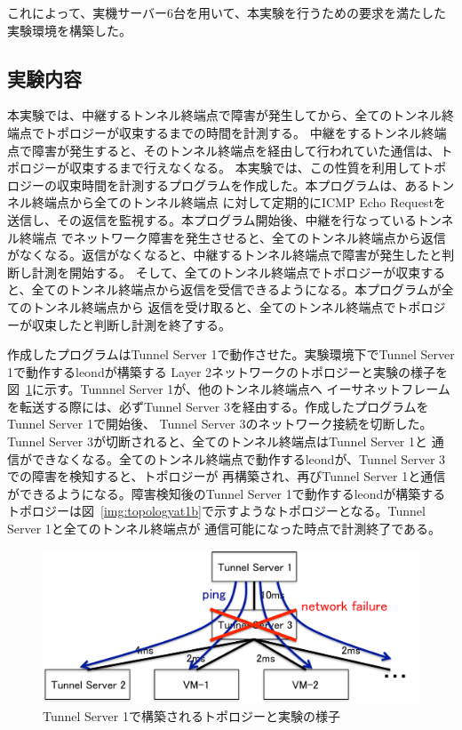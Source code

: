 これによって、実機サーバー6台を用いて、本実験を行うための要求を満たした実験環境を構築した。

\subsection{実験内容}
\label{experiment:spec}

本実験では、中継するトンネル終端点で障害が発生してから、全てのトンネル終端点でトポロジーが収束するまでの時間を計測する。
中継をするトンネル終端点で障害が発生すると、そのトンネル終端点を経由して行われていた通信は、トポロジーが収束するまで行えなくなる。
本実験では、この性質を利用してトポロジーの収束時間を計測するプログラムを作成した。本プログラムは、あるトンネル終端点から全てのトンネル終端点
に対して定期的にICMP Echo Requestを送信し、その返信を監視する。本プログラム開始後、中継を行なっているトンネル終端点
でネットワーク障害を発生させると、全てのトンネル終端点から返信がなくなる。返信がなくなると、中継するトンネル終端点で障害が発生したと判断し計測を開始する。
そして、全てのトンネル終端点でトポロジーが収束すると、全てのトンネル終端点から返信を受信できるようになる。本プログラムが全てのトンネル終端点から
返信を受け取ると、全てのトンネル終端点でトポロジーが収束したと判断し計測を終了する。

作成したプログラムはTunnel Server 1で動作させた。実験環境下でTunnel Server 1で動作するleondが構築する
Layer 2ネットワークのトポロジーと実験の様子を図~\ref{img:topologyat1}に示す。Tunnnel Server 1が、他のトンネル終端点へ
イーサネットフレームを転送する際には、必ずTunnel Server 3を経由する。作成したプログラムをTunnel Server 1で開始後、
Tunnel Server 3のネットワーク接続を切断した。Tunnel Server 3が切断されると、全てのトンネル終端点はTunnel Server 1と
通信ができなくなる。全てのトンネル終端点で動作するleondが、Tunnel Server 3での障害を検知すると、トポロジーが
再構築され、再びTunnel Server 1と通信ができるようになる。障害検知後のTunnel Server 1で動作するleondが構築する
トポロジーは図~\ref{img:topologyat1b}で示すようなトポロジーとなる。Tunnel Server 1と全てのトンネル終端点が
通信可能になった時点で計測終了である。

\begin{figure}
	\begin{center}
		\includegraphics[scale=0.70]{./img/topologyat1}
		\caption{Tunnel Server 1で構築されるトポロジーと実験の様子}
		\label{img:topologyat1}
	\end{center}
\end{figure}

